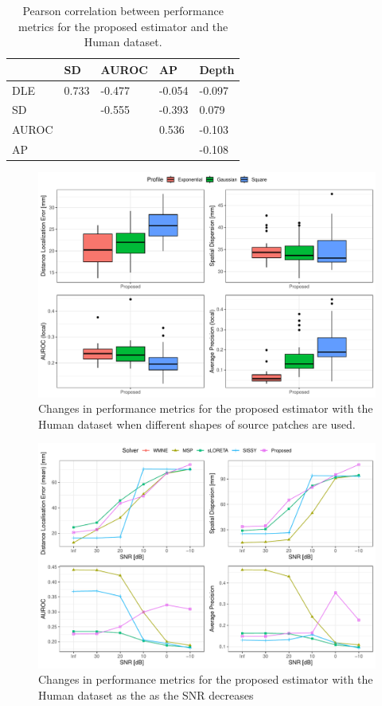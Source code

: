 \begin{table}[]
\centering
\begin{tabular}{@{}lllll@{}}
\toprule
      & SD    & AUROC & AP    & Depth  \\
\midrule
DLE   & 0.733 & -0.477 & -0.054 & -0.097 \\
SD    &       & -0.555 & -0.393 & 0.079  \\
AUROC &       &        & 0.536  & -0.103 \\
AP    &       &        &        & -0.108 \\
\bottomrule
\end{tabular}
\caption{Pearson correlation between performance metrics for the proposed estimator and the Human dataset.}
\label{tab:corr_P}
\end{table}

\begin{figure}
    \centering
    \includegraphics[width=0.9\linewidth]{img_stats/P_shape_EvalMetrics_Protocol04_30ALL.pdf}
    \caption{Changes in performance metrics for the proposed estimator with the Human dataset when different shapes of source patches are used.}
    \label{fig:deets_P}
\end{figure}

\begin{figure}
    \centering
    \includegraphics[width=0.9\linewidth]{img_stats/P_SNRdegradation_EvalMetrics_Protocol04_30.pdf}
    \caption{Changes in performance metrics for the proposed estimator with the Human dataset as the as the SNR decreases}
    \label{fig:noise_degradation_P}
\end{figure}


